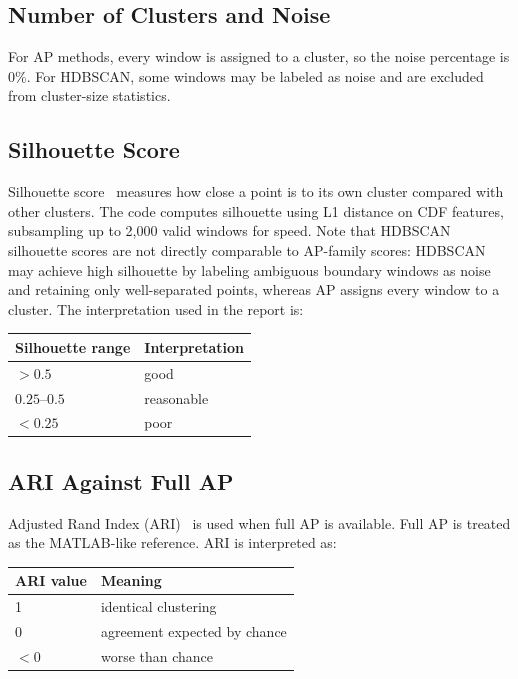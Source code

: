 \documentclass[11pt]{article}
\begin{document}
\subsection{Number of Clusters and Noise}

For AP methods, every window is assigned to a cluster, so the noise percentage is 0\%. For HDBSCAN, some windows may be labeled as noise and are excluded from cluster-size statistics.

\subsection{Silhouette Score}
\label{sec:silhouette}

Silhouette score~\cite{rousseeuw1987} measures how close a point is to its own cluster compared with other clusters. The code computes silhouette using L1 distance on CDF features, subsampling up to 2,000 valid windows for speed. Note that HDBSCAN silhouette scores are not directly comparable to AP-family scores: HDBSCAN may achieve high silhouette by labeling ambiguous boundary windows as noise and retaining only well-separated points, whereas AP assigns every window to a cluster. The interpretation used in the report is:

\begin{center}
\begin{tabular}{ll}
\toprule
Silhouette range & Interpretation \\
\midrule
$>0.5$ & good \\
$0.25$--$0.5$ & reasonable \\
$<0.25$ & poor \\
\bottomrule
\end{tabular}
\end{center}

\subsection{ARI Against Full AP}

Adjusted Rand Index (ARI)~\cite{hubert1985} is used when full AP is available. Full AP is treated as the MATLAB-like reference. ARI is interpreted as:

\begin{center}
\begin{tabular}{ll}
\toprule
ARI value & Meaning \\
\midrule
1 & identical clustering \\
0 & agreement expected by chance \\
$<0$ & worse than chance \\
\bottomrule
\end{tabular}
\end{center}
\end{document}
